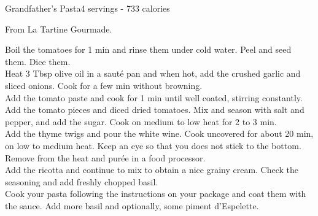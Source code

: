 \begin{recipe}{Grandfather’s Pasta}{4 servings - 733 calories}{}

\freeform From La Tartine Gourmade.


Boil the tomatoes for 1 min and rinse them under cold water. Peel and seed them. Dice them.\\

Heat 3 Tbsp olive oil in a sauté pan and when hot, add the crushed garlic and sliced onions. Cook for a few min without browning.\\

Add the tomato paste and cook for 1 min until well coated, stirring constantly.
Add the tomato pieces and diced dried tomatoes. Mix and season with salt and pepper, and add the sugar. Cook on medium to low heat for 2 to 3 min.\\

Add the thyme twigs and pour the white wine. Cook uncovered for about 20 min, on low to medium heat. Keep an eye so that you does not stick to the bottom.
Remove from the heat and purée in a food processor.\\

Add the ricotta and continue to mix to obtain a nice grainy cream. Check the seasoning and add freshly chopped basil.\\

Cook your pasta following the instructions on your package and coat them with the sauce. Add more basil and optionally, some piment d’Espelette.

\end{recipe}